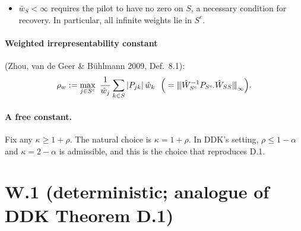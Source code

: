 \documentclass[11pt,a4paper]{article}
\numberwithin{equation}{section}
\theoremstyle{plain}
\theoremstyle{remark}
\newcommand{\opnorm}[1]{{\vert\kern-0.25ex\vert\kern-0.25ex\vert #1 \vert\kern-0.25ex\vert\kern-0.25ex\vert}}
\begin{document}
\begin{itemize}
  \item $\bar w_S<\infty$ requires the pilot to have no zero on $S$, a necessary condition for recovery. In particular, all infinite weights lie in $S^c$.
 \end{itemize}

\paragraph{Weighted irrepresentability constant} (Zhou, van de Geer \& Bühlmann 2009, Def.~8.1):
\begin{equation}\label{eq:rhow}
\rho_w:=\max_{j\in S^c}\ \frac{1}{\hat w_j}\sum_{k\in S}|P_{jk}|\,\hat w_k\ \ \Big(=\opnorm{\hat W_{S^c}^{-1}P_{S^c\cdot}\hat W_{SS}}_\infty\Big).
\end{equation}

\paragraph{A free constant.} Fix any $\kappa\ge1+\rho$. The natural choice is $\kappa=1+\rho$. In DDK's setting, $\rho\le1-\alpha$ and $\kappa=2-\alpha$ is admissible, and this is the choice that reproduces D.1.

\section{W.1 (deterministic; analogue of DDK Theorem D.1)}\label{sec:W1}
\end{document}
